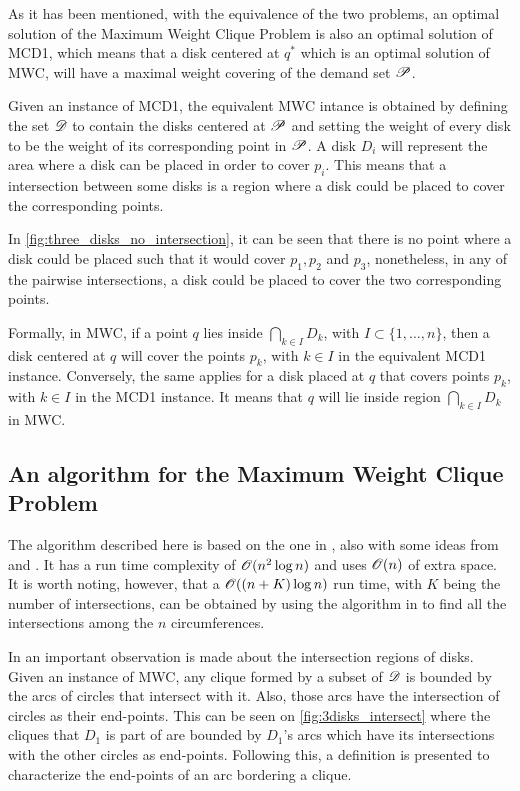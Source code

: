 As it has been mentioned, with the equivalence of the two problems, an optimal solution of the Maximum Weight Clique Problem is also an optimal solution of MCD1, which means that a disk centered at $q^*$ which is an optimal solution of MWC, will have a maximal weight covering of the demand set $\mathscr{P}$.

Given an instance of MCD1, the equivalent MWC intance is obtained by defining the set $\mathscr{D}$ to contain the disks centered at $\mathscr{P}$ and setting the weight of every disk to be the weight of its corresponding point in $\mathscr{P}$. A disk $D_i$ will represent the area where a disk can be placed in order to cover $p_i$. This means that a intersection between some disks is a region where a disk could be placed to cover the corresponding points.

In \autoref{fig:three_disks_no_intersection}, it can be seen that there is no point where a disk could be placed such that it would cover $p_1, p_2$ and $p_3$, nonetheless, in any of the pairwise intersections, a disk could be placed to cover the two corresponding points.

Formally, in MWC, if a point $q$ lies inside $\bigcap_{k \in I} D_k$, with $I \subset \{1,\dots,n\}$, then a disk centered at $q$ will cover the points $p_k$, with $k\in I$ in the equivalent MCD1 instance. Conversely, the same applies for a disk placed at $q$ that covers points $p_k$, with $k \in I$ in the MCD1 instance. It means that $q$ will lie inside region $\bigcap_{k \in I} D_k$ in MWC.

\subsection{An algorithm for the Maximum Weight Clique Problem}

The algorithm described here is based on the one in , also with some ideas from  and . It has a run time complexity of $\mathscr{O}(n^2\log{n})$ and uses $\mathscr{O}(n)$ of extra space. It is worth noting, however, that a $\mathscr{O}((n+K)\log{n})$ run time, with $K$ being the number of intersections, can be obtained by using the algorithm in  to find all the intersections among the $n$ circumferences.

In  an important observation is made about the intersection regions of disks. Given an instance of MWC, any clique formed by a subset of $\mathscr{D}$ is bounded by the arcs of circles that intersect with it. Also, those arcs have the intersection of circles as their end-points. This can be seen on \autoref{fig:3disks_intersect} where the cliques that $D_1$ is part of are bounded by $D_1$'s arcs which have its intersections with the other circles as end-points. Following this, a definition is presented to characterize the end-points of an arc bordering a clique.

